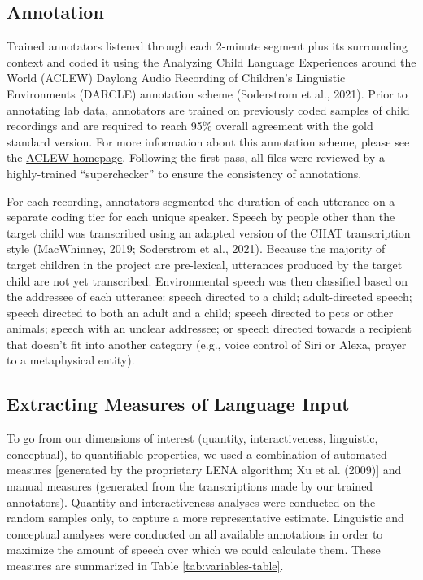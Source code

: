 \documentclass[
  man,floatsintext]{apa6}
\begin{document}
\hypertarget{annotation}{%
\subsection{Annotation}\label{annotation}}

Trained annotators listened through each 2-minute segment plus its surrounding context and coded it using the Analyzing Child Language Experiences around the World (ACLEW) Daylong Audio Recording of Children's Linguistic Environments (DARCLE) annotation scheme (Soderstrom et al., 2021). Prior to annotating lab data, annotators are trained on previously coded samples of child recordings and are required to reach 95\% overall agreement with the gold standard version. For more information about this annotation scheme, please see the \href{https://sites.google.com/view/aclewdid/home}{ACLEW homepage}. Following the first pass, all files were reviewed by a highly-trained ``superchecker'' to ensure the consistency of annotations.

For each recording, annotators segmented the duration of each utterance on a separate coding tier for each unique speaker. Speech by people other than the target child was transcribed using an adapted version of the CHAT transcription style (MacWhinney, 2019; Soderstrom et al., 2021). Because the majority of target children in the project are pre-lexical, utterances produced by the target child are not yet transcribed. Environmental speech was then classified based on the addressee of each utterance: speech directed to a child; adult-directed speech; speech directed to both an adult and a child; speech directed to pets or other animals; speech with an unclear addressee; or speech directed towards a recipient that doesn't fit into another category (e.g., voice control of Siri or Alexa, prayer to a metaphysical entity).

\hypertarget{extracting-measures-of-language-input}{%
\subsection{Extracting Measures of Language Input}\label{extracting-measures-of-language-input}}

To go from our dimensions of interest (quantity, interactiveness, linguistic, conceptual), to quantifiable properties, we used a combination of automated measures {[}generated by the proprietary LENA algorithm; Xu et al. (2009){]} and manual measures (generated from the transcriptions made by our trained annotators). Quantity and interactiveness analyses were conducted on the random samples only, to capture a more representative estimate. Linguistic and conceptual analyses were conducted on all available annotations in order to maximize the amount of speech over which we could calculate them. These measures are summarized in Table \ref{tab:variables-table}.
\end{document}
